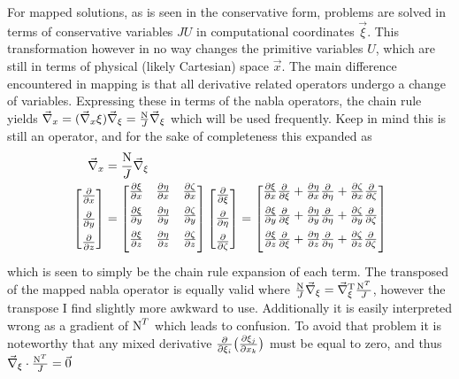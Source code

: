 \newcommand{\nablaXmapped}{ \begin{bmatrix}
    \fpartial{\xi}{x}{1}\fpartial{}{\xi}{1} + \fpartial{\eta}{x}{1}\fpartial{}{\eta}{1} + \fpartial{\zeta}{x}{1}\fpartial{}{\zeta}{1} \\[1.5ex]
    \fpartial{\xi}{y}{1}\fpartial{}{\xi}{1} + \fpartial{\eta}{y}{1}\fpartial{}{\eta}{1} + \fpartial{\zeta}{y}{1}\fpartial{}{\zeta}{1} \\[1.5ex]
    \fpartial{\xi}{z}{1}\fpartial{}{\xi}{1} + \fpartial{\eta}{z}{1}\fpartial{}{\eta}{1} + \fpartial{\zeta}{z}{1}\fpartial{}{\zeta}{1} \\[1.5ex]
  \end{bmatrix}}

\newcommand{\Uvec}{\begin{bmatrix}
                   u \\[1.5ex] v \\[1.5ex] w
                 \end{bmatrix}}

For mapped solutions, as is seen in the conservative form, problems are solved in terms of conservative variables $JU$ in computational coordinates $\vec{\xi}$. This transformation however in no way changes the primitive variables $U$, which are still in terms of physical (likely Cartesian) space $\vec{x}$. The main difference encountered in mapping is that all derivative related operators undergo a change of variables. Expressing these in terms of the nabla operators, the chain rule yields ${\vec{\nabla}}_x = ({\vec{\nabla}}_x \xi) {\vec{\nabla}}_{\xi} = \frac{{{\text{N}}}}{J} {\vec{\nabla}}_{\xi}$ which will be used frequently. Keep in mind this is still an operator, and for the sake of completeness this expanded as
\begin{align*}
  \vecnabla_x &= \NJ \vecnabla_{\xi} \\
  \begin{bmatrix}
    \fpartial{}{x}{1} \\[1.5ex]
    \fpartial{}{y}{1} \\[1.5ex]
    \fpartial{}{z}{1}
  \end{bmatrix}
           & =  \metricT \nablaXi  = \nablaXmapped
\end{align*}
which is seen to simply be the chain rule expansion of each term. The transposed of the mapped nabla operator is equally valid where $\frac{{{\text{N}}}}{J} {\vec{\nabla}}_{\xi} = {\vec{\nabla}}^{{\rm T}}_{\xi} \frac{{{\text{N}}^T}}{J}$, however the transpose I find slightly more awkward to use. Additionally it is easily interpreted wrong as a gradient of ${\text{N}}^T$ which leads to confusion. To avoid that problem it is noteworthy that any mixed derivative $\fpartial{}{\xi_i}{1} \big(\fpartial{\xi_j}{x_k}{1} \big)$ must be equal to zero, and thus ${\vec{\nabla}}_{\xi} \cdot \frac{{{\text{N}}^T}}{J} = \vec{0}$

